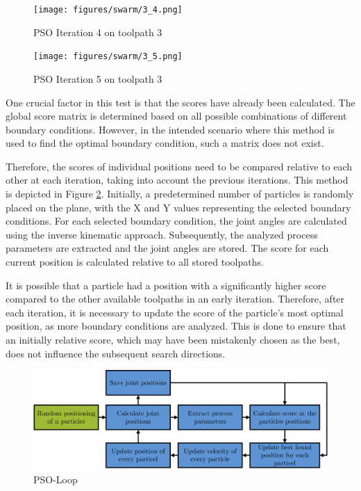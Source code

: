 \begin{figure}[H]	
		\centering
	\begin{minipage}{0.5\textwidth}
		\texttt{[image: figures/swarm/3\_4.png]}
		\caption{PSO Iteration 4 on toolpath 3}
		\label{4}
	\end{minipage}\hfill
	\begin{minipage}{0.5\textwidth}
		\texttt{[image: figures/swarm/3\_5.png]}
		\caption{PSO Iteration 5 on toolpath 3}
		\label{5}
	\end{minipage}\par
\end{figure}

One crucial factor in this test is that the scores have already been calculated. The global score matrix is determined based on all possible combinations of different boundary conditions. However, in the intended scenario where this method is used to find the optimal boundary condition, such a matrix does not exist.
\newpage

Therefore, the scores of individual positions need to be compared relative to each other at each iteration, taking into account the previous iterations. This method is depicted in Figure \ref{swarmloop}. Initially, a predetermined number of particles is randomly placed on the plane, with the X and Y values representing the selected boundary conditions. For each selected boundary condition, the joint angles are calculated using the inverse kinematic approach. Subsequently, the analyzed process parameters are extracted and the joint angles are stored. The score for each current position is calculated relative to all stored toolpaths.

It is possible that a particle had a position with a significantly higher score compared to the other available toolpaths in an early iteration. Therefore, after each iteration, it is necessary to update the score of the particle's most optimal position, as more boundary conditions are analyzed. This is done to ensure that an initially relative score, which may have been mistakenly chosen as the best, does not influence the subsequent search directions.

\begin{figure}[H]
	\centerline{\includegraphics[width=1\textwidth]{figures/swarmloop.png}}
	\caption{PSO-Loop}
	\label{swarmloop}
\end{figure}

